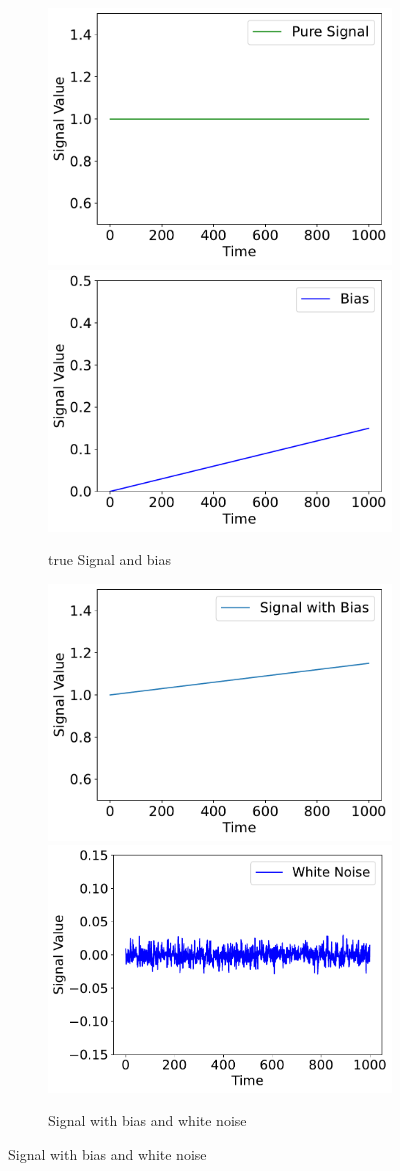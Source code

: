 \begin{figure}

  \begin{subfigure}{\linewidth}
  \includegraphics[width=.55\linewidth]{images/fig_chapter2/noise_figs/true_signal.pdf}\hfill
  \includegraphics[width=.55\linewidth]{images/fig_chapter2/noise_figs/bias.pdf}
  \caption{true Signal and bias}
  \end{subfigure}\par\medskip
  
  \begin{subfigure}{\linewidth}
  \includegraphics[width=.55\linewidth]{images/fig_chapter2/noise_figs/signal_bias.pdf}\hfill
  \includegraphics[width=.55\linewidth]{images/fig_chapter2/noise_figs/white_noise.pdf}
  \caption{Signal with bias and white noise}
  \end{subfigure}\par\medskip
  

\end{figure}
